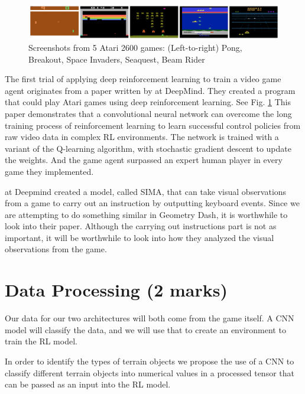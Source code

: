 \documentclass{article} %
\begin{document}
\begin{figure}[!h]
\begin{center}
\includegraphics[width=1.0\textwidth]{Figs/Deepmind_atari.png}
\end{center}
\caption{Screenshots from 5 Atari 2600 games: 
(Left-to-right) Pong, Breakout, Space Invaders, Seaquest, Beam Rider
\citep{Playing+Atari+with+Deep+Reinforcement+Learning}}
\label{fig:Deep_mind_Atari_AI}
\end{figure}

The first trial of applying deep reinforcement learning to train a
video game agent originates from a paper written by
\cite{Playing+Atari+with+Deep+Reinforcement+Learning} at 
DeepMind. They created a program that could play Atari games using
deep reinforcement learning. See Fig. \ref{fig:Deep_mind_Atari_AI}
This paper demonstrates that a convolutional neural network can 
overcome the long training process of reinforcement learning to 
learn successful control policies from raw video data in complex 
RL environments. The network is trained with a variant of the 
Q-learning algorithm, with stochastic gradient descent to update 
the weights. And the game agent surpassed an expert human player 
in every game they implemented.

\cite{DeepMind+Sima} at Deepmind created a model, called SIMA, 
that can take visual observations from a game to carry out an 
instruction by outputting keyboard events. Since we are 
attempting to do something similar in Geometry Dash, it is 
worthwhile to look into their paper. Although the carrying 
out instructions part is not as important, it will be worthwhile
to look into how they analyzed the visual observations from the 
game.

\section{Data Processing (2 marks)}

Our data for our two architectures will both come from the game itself. A CNN 
model will classify the data, and we will use that to create an environment to 
train the RL model. 

In order to identify the types of terrain objects we propose the use of a CNN 
to classify different terrain objects into numerical values in a processed 
tensor that can be passed as an input into the RL model. 
\end{document}
